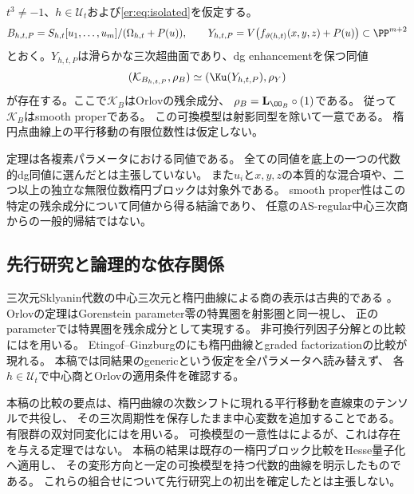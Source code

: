 \begin{theorem}[一ブロックの明示的可換復元]\label{er:thm:main}
$t^3\ne-1$、$h\in\mathscr U_t$および\eqref{er:eq:isolated}を仮定する。
\[
 B_{h,t,P}=S_{h,t}[u_1,\ldots,u_m]/(\Omega_{h,t}+P(u)),
 \qquad
 Y_{h,t,P}=V\bigl(f_{\vartheta(h,t)}(x,y,z)+P(u)\bigr)
 \subset\PP^{m+2}
\]
とおく。$Y_{h,t,P}$は滑らかな三次超曲面であり、dg enhancementを保つ同値
\begin{equation}\label{er:eq:main-pair}
 (\mathcal K_{B_{h,t,P}},\rho_B)
 \simeq (\Ku(Y_{h,t,P}),\rho_Y)
\end{equation}
が存在する。ここで$\mathcal K_B$はOrlovの残余成分、
$\rho_B=\mathbf L_{\OO_B}\circ(1)$である。
従って$\mathcal K_B$はsmooth properである。
この可換模型は射影同型を除いて一意である。
楕円点曲線上の平行移動の有限位数性は仮定しない。
\end{theorem}

\begin{remark}[主張の範囲]\label{er:rem:scope}
定理は各複素パラメータにおける同値である。
全ての同値を底上の一つの代数的dg同値に選んだとは主張していない。
また$u_i$と$x,y,z$の本質的な混合項や、二つ以上の独立な無限位数楕円ブロックは対象外である。
smooth proper性はこの特定の残余成分について同値から得る結論であり、
任意のAS-regular中心三次商からの一般的帰結ではない。
\end{remark}

\subsection{先行研究と論理的な依存関係}
三次元Sklyanin代数の中心三次元と楕円曲線による商の表示は古典的である
\cite{SmithTate,Walton,DeLaetLeBruyn}。
Orlovの定理はGorenstein parameter零の特異圏を射影圏と同一視し、
正のparameterでは特異圏を残余成分として実現する\cite[Theorem 2.5]{Orlov}。
非可換行列因子分解との比較には\cite[Theorem 5.8]{CCKM}を用いる。
Etingof--Ginzburgの\cite[Theorem 3.6.2]{EG}にも楕円曲線とgraded factorizationの比較が現れる。
本稿では同結果のgenericという仮定を全パラメータへ読み替えず、
各$h\in\mathscr U_t$で中心商とOrlovの適用条件を確認する。

本稿の比較の要点は、楕円曲線の次数シフトに現れる平行移動を直線束のテンソルで共役し、
その三次周期性を保存したまま中心変数を追加することである。
有限群の双対同変化には\cite[Theorem 4.2, Section 8]{Elagin}を用いる。
可換模型の一意性は\cite[Theorem 1.7]{LZ}によるが、これは存在を与える定理ではない。
本稿の結果は既存の一楕円ブロック比較をHesse量子化へ適用し、
その変形方向と一定の可換模型を持つ代数的曲線を明示したものである。
これらの組合せについて先行研究上の初出を確定したとは主張しない。

